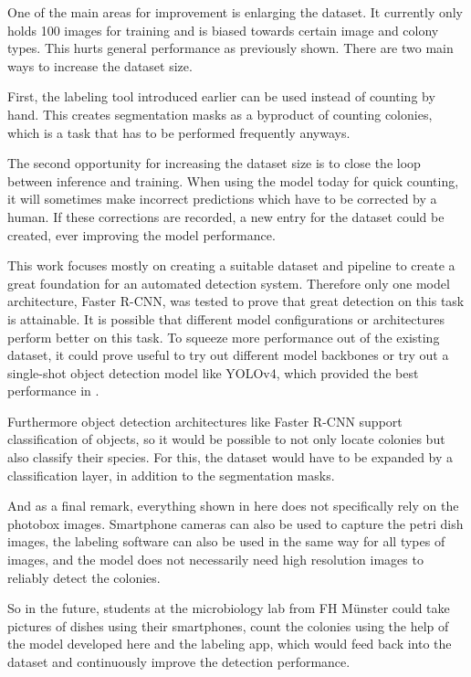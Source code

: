 One of the main areas for improvement is enlarging the dataset. It currently only holds 100 images for training and is biased towards certain image and colony types. This hurts general performance as previously shown. There are two main ways to increase the dataset size. 

First, the labeling tool introduced earlier can be used instead of counting by hand. This creates segmentation masks as a byproduct of counting colonies, which is a task that has to be performed frequently anyways.

The second opportunity for increasing the dataset size is to close the loop between inference and training. When using the model today for quick counting, it will sometimes make incorrect predictions which have to be corrected by a human. If these corrections are recorded, a new entry for the dataset could be created, ever improving the model performance.

This work focuses mostly on creating a suitable dataset and pipeline to create a great foundation for an automated detection system. Therefore only one model architecture, Faster R-CNN, was tested to prove that great detection on this task is attainable. It is possible that different model configurations or architectures perform better on this task. To squeeze more performance out of the existing dataset, it could prove useful to try out different model backbones or try out a single-shot object detection model like YOLOv4, which provided the best performance in \citet{Majchrowska_2022}.

Furthermore object detection architectures like Faster R-CNN support classification of objects, so it would be possible to not only locate colonies but also classify their species. For this, the dataset would have to be expanded by a classification layer, in addition to the segmentation masks.

And as a final remark, everything shown in here does not specifically rely on the photobox images. Smartphone cameras can also be used to capture the petri dish images, the labeling software can also be used in the same way for all types of images, and the model does not necessarily need high resolution images to reliably detect the colonies.

So in the future, students at the microbiology lab from FH Münster could take pictures of dishes using their smartphones, count the colonies using the help of the model developed here and the labeling app, which would feed back into the dataset and continuously improve the detection performance.
